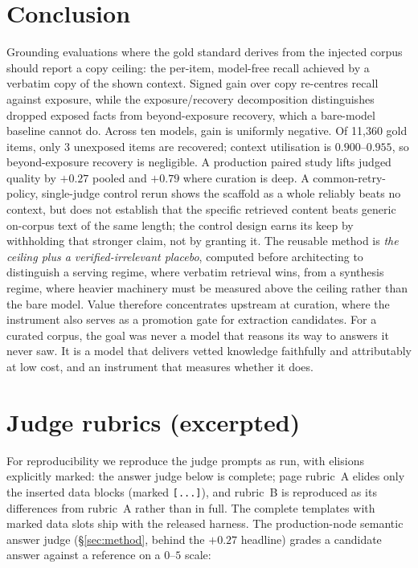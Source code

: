 \documentclass[10pt,twocolumn]{article}
\begin{document}
\section{Conclusion}\label{sec:conclusion}
Grounding evaluations where the gold standard derives from the injected corpus should report a copy ceiling: the per-item, model-free recall achieved by a verbatim copy of the shown context. Signed gain over copy re-centres recall against exposure, while the exposure/recovery decomposition distinguishes dropped exposed facts from beyond-exposure recovery, which a bare-model baseline cannot do. Across ten models, gain is uniformly negative. Of 11{,}360 gold items, only 3 unexposed items are recovered; context utilisation is $0.900$--$0.955$, so beyond-exposure recovery is negligible. A production paired study lifts judged quality by $+0.27$ pooled and $+0.79$ where curation is deep. A common-retry-policy, single-judge control rerun shows the scaffold as a whole reliably beats no context, but does not establish that the specific retrieved content beats generic on-corpus text of the same length; the control design earns its keep by withholding that stronger claim, not by granting it. The reusable method is \emph{the ceiling plus a verified-irrelevant placebo}, computed before architecting to distinguish a serving regime, where verbatim retrieval wins, from a synthesis regime, where heavier machinery must be measured above the ceiling rather than the bare model. Value therefore concentrates upstream at curation, where the instrument also serves as a promotion gate for extraction candidates. For a curated corpus, the goal was never a model that reasons its way to answers it never saw. It is a model that delivers vetted knowledge faithfully and attributably at low cost, and an instrument that measures whether it does.

\appendix
\onecolumn
\section{Judge rubrics (excerpted)}\label{sec:appendix-rubrics}
For reproducibility we reproduce the judge prompts as run, with elisions explicitly
marked: the answer judge below is complete; page rubric~A elides only the inserted
data blocks (marked \texttt{[...]}), and rubric~B is reproduced as its differences
from rubric~A rather than in full. The complete templates with marked data slots
ship with the released harness. The
production-node semantic answer judge (\S\ref{sec:method}, behind the $+0.27$
headline) grades a candidate answer against a reference on a $0$--$5$ scale:
\end{document}
